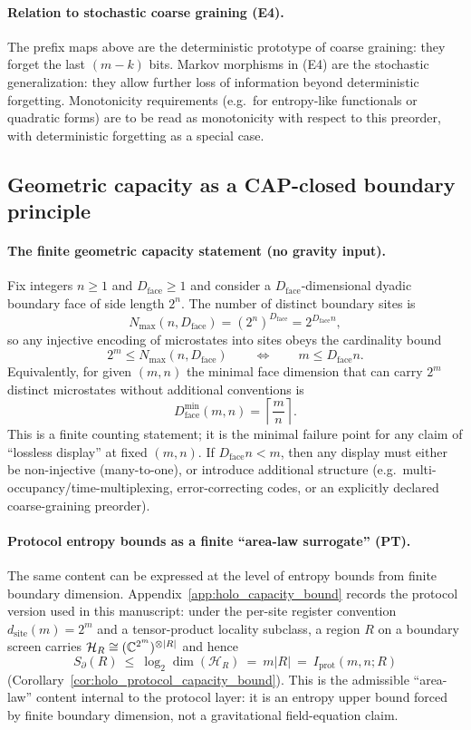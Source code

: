 \paragraph{Relation to stochastic coarse graining (E4).}
\InterfaceTag The prefix maps above are the deterministic prototype of coarse graining: they forget the last $(m-k)$ bits.
Markov morphisms in (E4) are the stochastic generalization: they allow further loss of information beyond deterministic forgetting.
Monotonicity requirements (e.g.\ for entropy-like functionals or quadratic forms) are to be read as monotonicity with respect to this preorder, with deterministic forgetting as a special case.

\subsection{Geometric capacity as a CAP-closed boundary principle}
\label{subsec:cap_geometric_capacity_boundary_principle}

\paragraph{The finite geometric capacity statement (no gravity input).}
\MathTag Fix integers $n\ge 1$ and $D_{\mathrm{face}}\ge 1$ and consider a $D_{\mathrm{face}}$-dimensional dyadic boundary face of side length $2^n$.
The number of distinct boundary sites is
\[
N_{\max}(n,D_{\mathrm{face}})=(2^n)^{D_{\mathrm{face}}}=2^{D_{\mathrm{face}}n},
\]
so any injective encoding of microstates into sites obeys the cardinality bound
\[
2^m\le N_{\max}(n,D_{\mathrm{face}})\qquad\Longleftrightarrow\qquad m\le D_{\mathrm{face}}n.
\]
Equivalently, for given $(m,n)$ the minimal face dimension that can carry $2^m$ distinct microstates without additional conventions is
\[
D_{\mathrm{face}}^{\min}(m,n)=\left\lceil \frac{m}{n}\right\rceil.
\]
\AuditTag This is a finite counting statement; it is the minimal failure point for any claim of ``lossless display'' at fixed $(m,n)$.
If $D_{\mathrm{face}}n<m$, then any display must either be non-injective (many-to-one), or introduce additional structure (e.g.\ multi-occupancy/time-multiplexing, error-correcting codes, or an explicitly declared coarse-graining preorder).

\paragraph{Protocol entropy bounds as a finite ``area-law surrogate'' (PT).}
\InterfaceTag The same content can be expressed at the level of entropy bounds from finite boundary dimension.
Appendix~\ref{app:holo_capacity_bound} records the protocol version used in this manuscript:
under the per-site register convention $d_{\mathrm{site}}(m)=2^m$ and a tensor-product locality subclass, a region $R$ on a boundary screen carries
$\mathcal{H}_R\cong (\mathbb{C}^{2^m})^{\otimes |R|}$ and hence
\[
S_{\partial}(R)\ \le\ \log_2\dim(\mathcal{H}_R)\ =\ m|R|\ =\ I_{\mathrm{prot}}(m,n;R)
\]
(Corollary~\ref{cor:holo_protocol_capacity_bound}).
This is the admissible ``area-law'' content internal to the protocol layer: it is an entropy upper bound forced by finite boundary dimension, not a gravitational field-equation claim.

